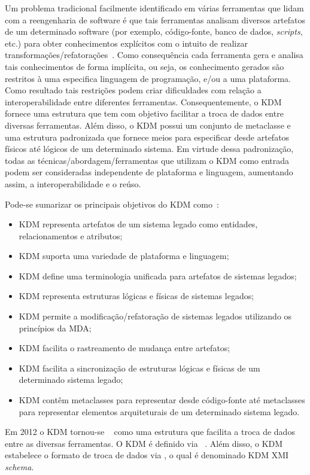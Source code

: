 Um problema tradicional facilmente identificado em várias ferramentas que lidam com a reengenharia de software é que tais ferramentas analisam diversos artefatos de um determinado software (por exemplo, código-fonte, banco de dados, \textit{scripts}, etc.) para obter conhecimentos explícitos com o intuito de realizar transformações/refatorações~\cite{rosenberg, Canfora2011}. Como consequência cada ferramenta gera e analisa tais conhecimentos de forma implícita, ou seja, os conhecimento gerados são restritos à uma especifica linguagem de programação, e/ou a uma plataforma. Como resultado tais restrições podem criar dificuldades com relação a interoperabilidade entre diferentes ferramentas. Consequentemente, o KDM fornece uma estrutura que tem com objetivo facilitar a troca de dados entre diversas ferramentas. Além disso, o KDM possui um conjunto de metaclasse e uma estrutura padronizada que fornece meios para especificar desde artefatos físicos até lógicos de um determinado sistema. Em virtude dessa padronização, todas as técnicas/abordagem/ferramentas que utilizam o KDM como entrada podem ser consideradas independente de plataforma e linguagem, aumentando assim, a interoperabilidade e o reúso. 


Pode-se sumarizar os principais objetivos do KDM como~\cite{ADM:OMG}:

\begin{itemize}
	\item KDM representa artefatos de um sistema legado como entidades, relacionamentos e atributos;
	\item KDM suporta uma  variedade de plataforma e linguagem;
	\item KDM define uma terminologia unificada para artefatos de sistemas legados;
	\item KDM representa estruturas lógicas e físicas de sistemas legados;
	\item KDM permite a modificação/refatoração de sistemas legados utilizando os princípios da MDA;
	\item KDM facilita o rastreamento de mudança entre artefatos;
	\item KDM facilita a sincronização de estruturas lógicas e físicas de um determinado sistema legado;
	\item KDM contêm metaclasses para representar desde código-fonte até metaclasses para representar elementos arquiteturais de um determinado sistema legado.
\end{itemize}

Em 2012 o KDM tornou-se ~\cite{KDM:ISO} como uma estrutura que facilita a troca de dados entre as diversas ferramentas. O KDM é definido via ~\cite{MOF}. Além disso, o KDM estabelece o formato de troca de dados via , o qual é denominado KDM XMI \emph{schema}. 


